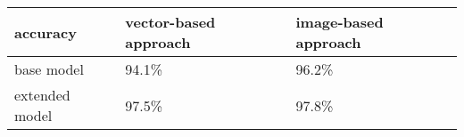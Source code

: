 \begin{table}[h]
\begin{tabular}{|l|l|l|}
\hline
 accuracy    & vector-based approach & image-based approach \\ \hline
base model   & 94.1\%                & 96.2\%               \\ \hline
extended model & 97.5\%                & 97.8\%               \\ \hline
\end{tabular}
\end{table}